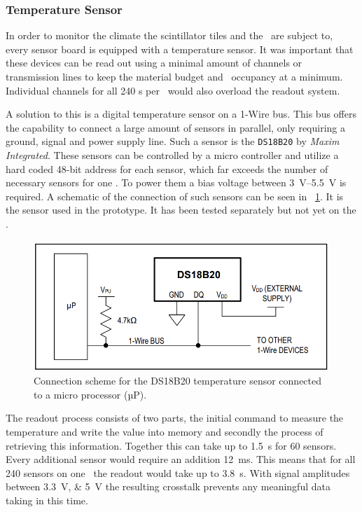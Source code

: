 \documentclass[../BTOF_summary.tex]{subfiles}
\begin{document}
\subsubsection*{Temperature Sensor}
In order to monitor the climate the scintillator tiles and the \sipms\ are subject to, every sensor board is equipped with a temperature sensor. It was important that these devices can be read out using a minimal amount of channels or transmission lines to keep the material budget and \railboard\ occupancy at a minimum.
Individual channels for all 240 \sensorboard s per \sm\ would also overload the readout system.

A solution to this is a digital temperature sensor on a 1-Wire bus.
This bus offers the capability to connect a large amount of sensors in parallel, only requiring a ground, signal and power supply line.
Such a sensor is the \texttt{DS18B20} by \textit{Maxim Integrated}.
These sensors can be controlled by a micro controller and utilize a hard coded 48-bit address for each sensor, which far exceeds the number of necessary sensors for one \railboard .
To power them a bias voltage between \SIrange[]{3}{5.5}{V} is required.
A schematic of the connection of such sensors can be seen in \fig ~\ref{fig:DS18B20_connection}.
It is the sensor used in the prototype.
It has been tested separately but not yet on the \railboard .

\begin{figure}[htbp]
	\centering
	\includegraphics[width=.6\textwidth]{fig/DS18B20_connection.png}
	\caption[Connection scheme for the DS18B20 temperature sensor.]{Connection scheme for the DS18B20 temperature sensor connected to a micro processor (µP).}
	\label{fig:DS18B20_connection}
\end{figure}

The readout process consists of two parts, the initial command to measure the temperature and write the value into memory and secondly the process of retrieving this information.
Together this can take up to \SI{1.5}{s} for 60 sensors.
Every additional sensor would require an addition \SI{12}{ms}.
This means that for all 240 sensors on one \sm\ the readout would take up to \SI{3.8}{s}.
With signal amplitudes between \SIlist{3.3;5}{V} the resulting crosstalk prevents any meaningful data taking in this time.
\end{document}
